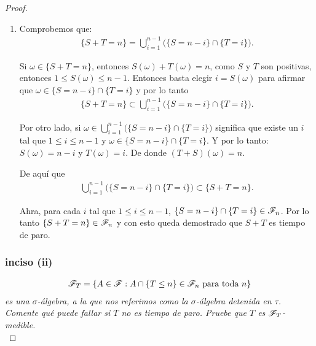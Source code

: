 \begin{proof}
\begin{enumerate}
				Por último, $\{ T \leq n \} \in \F_n$ y $\{ S \leq n \} \in \F_n$. Por lo tanto	\\	
				$\{ T \leq n \} \cap \{ S \leq n\} = \{ S \vee T \leq n \} \in \F_n$ y con esto demostramos que 
				$ S \vee T$ es tiempo de paro.\\
				
			\item
				Comprobemos que:
				\begin{align}
					\{ S + T = n \} = \bigcup_{i = 1}^{n-1} \bigg( \{S = n - i\} \cap \{T = i\} \bigg).
				\end{align}
				
				Si $\omega \in \{ S + T = n \}$, entonces $S(\omega) + T(\omega) = n$, como $S$ y $T$ son positivas,
				entonces $1 \leq S(\omega) \leq n-1$. Entonces basta elegir $i = S(\omega)$ para afirmar que 
				$\omega \in \{S = n - i\} \cap \{T = i\}$ y por lo tanto
				\begin{align}
				\{ S + T = n \} \subset \bigcup_{i = 1}^{n-1} \bigg( \{S = n - i\} \cap \{T = i\} \bigg).
				\end{align}
				
				Por otro lado, si $\omega \in \bigcup_{i = 1}^{n-1} \bigg( \{S = n - i\} \cap \{T = i\} \bigg)$
				significa que existe un $i$ tal que $1\leq i \leq n-1$ y $\omega \in \{S = n - i\} \cap \{T = i\}$.
				Y por lo tanto: $S(\omega) = n-i$ y $T(\omega) = i$. De donde $(T + S)(\omega) = n$.
				
				De aquí que
				\begin{align}
					\bigcup_{i = 1}^{n-1} \bigg( \{S = n - i\} \cap \{T = i\} \bigg) \subset \{ S + T = n \}. 
				\end{align}
				
				Ahra, para cada $i$ tal que $1 \leq i \leq n-1$, $\{S = n - i\} \cap \{T = i\} \in \mathscr{F}_n$.
				Por lo tanto $\{ S + T = n\} \in \mathscr{F}_n$ y con esto queda demostrado que $ S + T $ es tiempo de paro.
		\end{enumerate}
		
	\subsubsection{inciso (ii)}
	\emph{
		\begin{align}
			\mathscr{F}_T=\left\{ A\in\mathscr{F}:A\cap\left\{ T\leq n\right\} \in\mathscr{F}_n\text{ para toda } n\right\} 
		\end{align}
		es una $\sigma$-\'algebra, 
		a la que nos referimos como la $\sigma$-\'algebra detenida en $\tau$. Comente qu\'e puede fallar si $T$ no es tiempo de paro. 
		Pruebe que $T$ es $\mathscr{F}_T$-medible.\\		
	}			
			

\end{proof}
